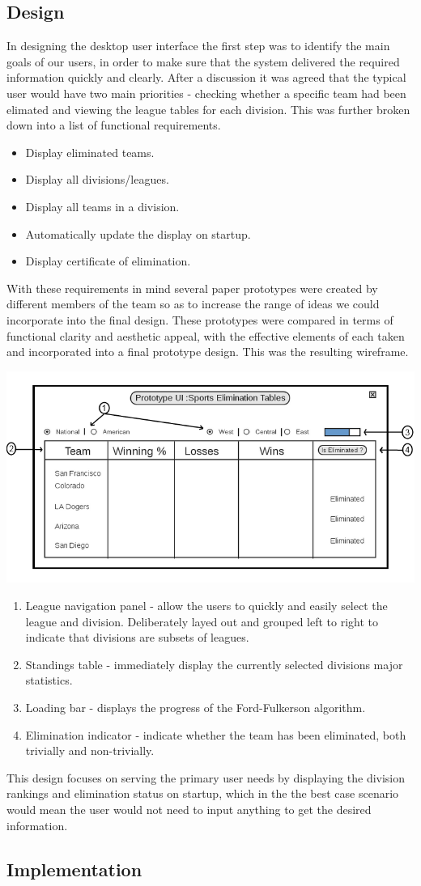 \subsection{Design}
In designing the desktop user interface the first step was to identify the
main goals of our users, in order to make sure that the system delivered
the required information quickly and clearly. After a discussion it was 
agreed that the typical user would have two main priorities - checking 
whether a specific team had been elimated and viewing the league tables for
each division. This was further broken down into a list of functional requirements.

\begin{itemize}
\item Display eliminated teams.
\item Display all divisions/leagues.
\item Display all teams in a division.
\item Automatically update the display on startup.
\item Display certificate of elimination.
\end{itemize}

With these requirements in mind several paper prototypes were
created by different members of the team so as to increase the range of
ideas we could incorporate into the final design. These prototypes were
compared in terms of functional clarity and aesthetic appeal, with the 
effective elements of each taken and incorporated into a final prototype
design. This was the resulting wireframe.

\includegraphics[width=\linewidth,keepaspectratio]
{images/Prototype_UI.png}

\begin{enumerate}
\item League navigation panel - allow the users to quickly and easily select the
league and division. Deliberately layed out and grouped left to right to indicate
that divisions are subsets of leagues.
\item Standings table - immediately display the currently selected divisions major 
statistics.
\item Loading bar - displays the progress of the Ford-Fulkerson algorithm.
\item Elimination indicator - indicate whether the team has been eliminated, both
trivially and non-trivially.
\end{enumerate}

This design focuses on serving the primary user needs by displaying the division 
rankings and elimination status on startup, which in the the best case scenario 
would mean the user would not need to input anything to get the desired information.
\subsection{Implementation}
